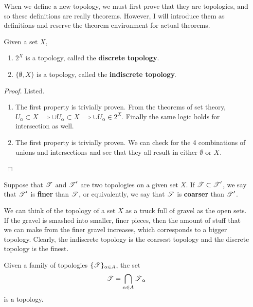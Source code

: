   When we define a new topology, we must first prove that they are topologies, and so these definitions are really theorems. However, I will introduce them as definitions and reserve the theorem environment for actual theorems. 

  \begin{definition}
    Given a set $X$, 
    \begin{enumerate}
      \item $2^X$ is a topology, called the \textbf{discrete topology}. 
      \item $\{\emptyset, X \}$ is a topology, called the \textbf{indiscrete topology}. 
    \end{enumerate}
  \end{definition}
  \begin{proof}
    Listed. 
    \begin{enumerate}
      \item The first property is trivially proven. From the theorems of set theory, $U_\alpha \subset X \implies \cup U_\alpha \subset X \implies \cup U_\alpha \in 2^X$. Finally the same logic holds for intersection as well. 
      \item The first property is trivially proven. We can check for the 4 combinations of unions and intersections and see that they all result in either $\emptyset$ or $X$. 
    \end{enumerate}
  \end{proof}

  \begin{definition}
    Suppose that $\operatorname{\mathscr{T}}$ and $\operatorname{\mathscr{T}}^\prime$ are two topologies on a given set $X$. If $\operatorname{\mathscr{T}} \subset \operatorname{\mathscr{T}}^\prime$, we say that $\operatorname{\mathscr{T}}^\prime$ is \textbf{finer} than $\operatorname{\mathscr{T}}$, or equivalently, we say that $\operatorname{\mathscr{T}}$ is \textbf{coarser} than $\operatorname{\mathscr{T}}^\prime$. 
  \end{definition}

  We can think of the topology of a set $X$ as a truck full of gravel as the open sets. If the gravel is smashed into smaller, finer pieces, then the amount of stuff that we can make from the finer gravel increases, which corresponds to a bigger topology. Clearly, the indiscrete topology is the coarsest topology and the discrete topology is the finest. 

  \begin{theorem}
    Given a family of topologies $\{\operatorname{\mathscr{T}}\}_{\alpha \in A}$, the set 
    \begin{equation}
      \operatorname{\mathscr{T}} = \bigcap_{\alpha \in A} \operatorname{\mathscr{T}}_\alpha
    \end{equation}
    is a topology. 
  \end{theorem}

